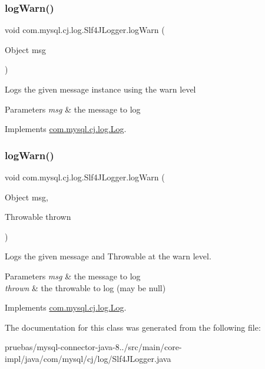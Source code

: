 \subsubsection{\texorpdfstring{log\+Warn()}{logWarn()}\hspace{0.1cm}{\footnotesize\ttfamily [1/2]}}
{\footnotesize\ttfamily void com.\+mysql.\+cj.\+log.\+Slf4\+J\+Logger.\+log\+Warn (\begin{DoxyParamCaption}\item[{Object}]{msg }\end{DoxyParamCaption})}

Logs the given message instance using the \textquotesingle{}warn\textquotesingle{} level


\begin{DoxyParams}{Parameters}
{\em msg} & the message to log \\
\hline
\end{DoxyParams}


Implements \mbox{\hyperlink{interfacecom_1_1mysql_1_1cj_1_1log_1_1_log_a3a30dcfb7f5790b79e9db64431107cfc}{com.\+mysql.\+cj.\+log.\+Log}}.

\mbox{\label{classcom_1_1mysql_1_1cj_1_1log_1_1_slf4_j_logger_a617f07e2c9b52bc774d8e8ea83ace092}} 
\subsubsection{\texorpdfstring{log\+Warn()}{logWarn()}\hspace{0.1cm}{\footnotesize\ttfamily [2/2]}}
{\footnotesize\ttfamily void com.\+mysql.\+cj.\+log.\+Slf4\+J\+Logger.\+log\+Warn (\begin{DoxyParamCaption}\item[{Object}]{msg,  }\item[{Throwable}]{thrown }\end{DoxyParamCaption})}

Logs the given message and Throwable at the \textquotesingle{}warn\textquotesingle{} level.


\begin{DoxyParams}{Parameters}
{\em msg} & the message to log \\
\hline
{\em thrown} & the throwable to log (may be null) \\
\hline
\end{DoxyParams}


Implements \mbox{\hyperlink{interfacecom_1_1mysql_1_1cj_1_1log_1_1_log_a36af866ddfdda47938c768d3d0e68572}{com.\+mysql.\+cj.\+log.\+Log}}.



The documentation for this class was generated from the following file\+:\begin{DoxyCompactItemize}
\item 
pruebas/mysql-\/connector-\/java-\/8../src/main/core-\/impl/java/com/mysql/cj/log/Slf4\+J\+Logger.\+java\end{DoxyCompactItemize}
